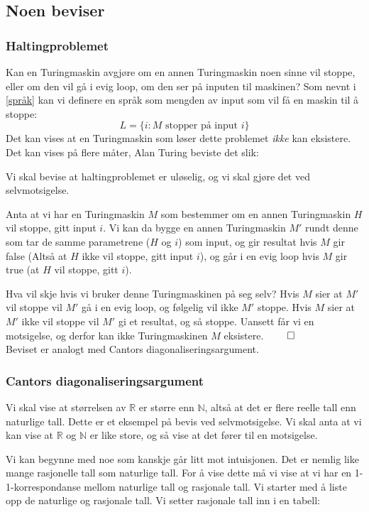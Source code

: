 \subsection{Noen beviser}
\subsubsection{Haltingproblemet}
Kan en Turingmaskin avgjøre om en annen Turingmaskin noen sinne vil stoppe, eller om den vil gå i evig loop, om den ser på inputen til maskinen? Som nevnt i \ref{språk} kan vi definere en språk som mengden av input som vil få en maskin til å stoppe:
\[ L = \{i : M \text{ stopper på input } i \} \]
Det kan vises at en Turingmaskin som løser dette problemet \emph{ikke} kan eksistere. Det kan vises på flere måter, Alan Turing beviste det slik:

\label{haltingProof}
Vi skal bevise at haltingproblemet er uløselig, og vi skal gjøre det ved selvmotsigelse. 

Anta at vi har en Turingmaskin $ M $ som bestemmer om en annen Turingmaskin $ H $ vil stoppe, gitt input $ i $. Vi kan da bygge en annen Turingmaskin $ M' $ rundt denne som tar de samme parametrene ($ H $ og $ i $) som input, og gir resultat hvis $ M $ gir false (Altså at $ H $ ikke vil stoppe, gitt input $ i $), og går i en evig loop hvis $ M $ gir true (at $ H $ vil stoppe, gitt $ i $). 

Hva vil skje hvis vi bruker denne Turingmaskinen på seg selv? Hvis $ M $ sier at $ M' $ vil stoppe vil $ M' $ gå i en evig loop, og følgelig vil ikke $ M' $ stoppe. Hvis $ M $ sier at $ M' $ ikke vil stoppe vil $ M' $ gi et resultat, og så stoppe. Uansett får vi en motsigelse, og derfor kan ikke Turingmaskinen $ M $ eksistere. $ \hfill\qed $ \\

\noindent Beviset er analogt med Cantors diagonaliseringsargument.

\subsubsection{Cantors diagonaliseringsargument}
Vi skal vise at størrelsen av $ \mathbb{R} $ er større enn $ \mathbb{N} $, altså at det er flere reelle tall enn naturlige tall. Dette er et eksempel på bevis ved selvmotsigelse. Vi skal anta at vi kan vise at $ \mathbb{R} $ og $ \mathbb{N} $ er like store, og så vise at det fører til en motsigelse.

Vi kan begynne med noe som kanskje går litt mot intuisjonen. Det er nemlig like mange rasjonelle tall som naturlige tall. For å vise dette må vi vise at vi har en 1-1-korrespondanse mellom naturlige tall og rasjonale tall. Vi starter med å liste opp  de naturlige og rasjonale tall. Vi setter rasjonale tall inn i en tabell:

